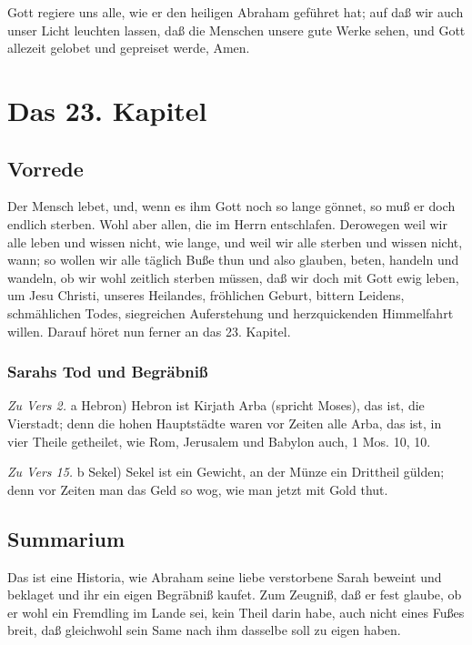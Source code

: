 Gott regiere uns alle, wie er den heiligen Abraham geführet hat; auf daß wir auch unser Licht leuchten lassen, daß die Menschen unsere gute Werke sehen, und Gott allezeit gelobet und gepreiset werde, Amen.

\chapter{Das 23. Kapitel}

\section{Vorrede}

Der Mensch lebet, und, wenn es ihm Gott noch so lange gönnet, so muß er doch endlich sterben. Wohl aber allen, die im Herrn entschlafen. Derowegen weil wir alle leben und wissen nicht, wie lange, und weil wir alle sterben und wissen nicht, wann; so wollen wir alle täglich Buße thun und also glauben, beten, handeln und wandeln, ob wir wohl zeitlich sterben müssen, daß wir doch mit Gott ewig leben, um Jesu Christi, unseres Heilandes, fröhlichen Geburt, bittern Leidens, schmählichen Todes, siegreichen Auferstehung und herzquickenden Himmelfahrt willen. Darauf höret nun ferner an das 23. Kapitel.

\subsection{Sarahs Tod und Begräbniß}

\emph{Zu Vers 2.} a Hebron) Hebron ist Kirjath Arba (spricht Moses), das ist, die Vierstadt; denn die hohen Hauptstädte waren vor Zeiten alle Arba, das ist, in vier Theile getheilet, wie Rom, Jerusalem und Babylon auch, 1 Mos. 10, 10.

\emph{Zu Vers 15.} b Sekel) Sekel ist ein Gewicht, an der Münze ein Drittheil gülden; denn vor Zeiten man das Geld so wog, wie man jetzt mit Gold thut.

\section{Summarium}

Das ist eine Historia, wie Abraham seine liebe verstorbene Sarah beweint und beklaget und ihr ein eigen Begräbniß kaufet. Zum Zeugniß, daß er fest glaube, ob er wohl ein Fremdling im Lande sei, kein Theil darin habe, auch nicht eines Fußes breit, daß gleichwohl sein Same nach ihm dasselbe soll zu eigen haben.

